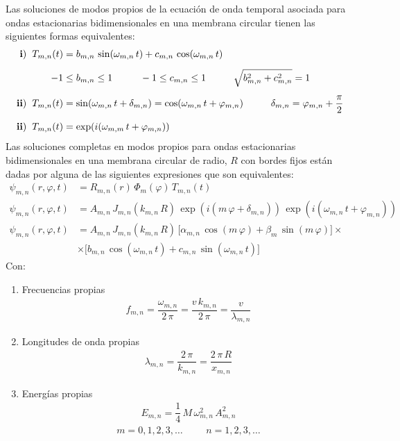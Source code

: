 Las soluciones de modos propios de la ecuación de onda temporal asociada para ondas estacionarias bidimensionales en una membrana circular tienen las siguientes formas equivalentes:
\begin{align*}
\mathbf{i)} \hspace{0.2cm} T_{m,n} (t) &= b_{m,n} \, \sin (\omega_{m,n} \, t) + c_{m,n} \, \cos (\omega_{m,n} \, t) \\[0.5em]
-1 &\leq b_{m,n} \leq 1 \hspace{1cm} -1 \leq c_{m,n} \leq 1 \hspace{1cm} \sqrt{b_{m,n}^{2} + c_{m,n}^{2}} = 1 \\[0.5em]
\mathbf{ii)} \hspace{0.2cm} T_{m,n} (t) &= \sin (\omega_{m,n} \, t + \delta_{m,n}) = \cos(\omega_{m,n} \, t + \varphi_{m,n}) \hspace{1cm} \delta_{m,n} = \varphi_{m,n} + \dfrac{\pi}{2} \\[0.5em]
\mathbf{ii)} \hspace{0.2cm} T_{m,n} (t) &= \exp(i(\omega_{m,m} \, t + \varphi_{m,n}))
\end{align*}
Las soluciones completas en modos propios para ondas estacionarias bidimensionales en una membrana circular de radio, $R$ con bordes fijos están dadas por alguna de las siguientes expresiones que son equivalentes:
\begin{align*}
\psi_{m,n} (r ,\varphi, t) &= R_{m,n} (r) \, \Phi_{m} (\varphi) \, T_{m,n} (t) \\[0.5em]
\psi_{m,n} (r ,\varphi, t) &= A_{m,n} \, J_{m,n} (k_{m,n} \, R) \, \exp(i(m \, \varphi + \delta_{m,n})) \, \exp(i(\omega_{m,n} \, t + \varphi_{m,n})) \\[0.5em]
\psi_{m,n} (r ,\varphi, t) &= A_{m,n} \, J_{m,n} (k_{m,n} \, R) \, \big[ \alpha_{m,n} \,  \cos (m \, \varphi) + \beta_{m} \, \sin (m \, \varphi) \big] \times \\[0.5em]
&\times \big[ b_{m,n} \,  \cos (\omega_{m,n} \, t) + c_{m,n} \, \sin (\omega_{m,n} \, t) \big]
\end{align*}
Con:
\begin{enumerate}[label=\alph*)]
\item Frecuencias propias
\begin{align*}
f_{m,n} = \dfrac{\omega_{m,n}}{2 \, \pi} = \dfrac{v \, k_{m,n}}{2 \, \pi} = \dfrac{v}{\lambda_{m,n}}
\end{align*}
\item Longitudes de onda propias
\begin{align*}
\lambda_{m,n} = \dfrac{2 \, \pi}{k_{m,n}} = \dfrac{2 \, \pi \, R}{x_{m,n}}
\end{align*}
\item Energías propias
\begin{align*}
E_{m,n} = \dfrac{1}{4} \, M \, \omega_{m,n}^{2} \, A_{m,n}^{2}
\end{align*}
\begin{align*}
m = 0, 1, 2, 3, \ldots \hspace{1cm} n = 1, 2, 3, \ldots
\end{align*}
\end{enumerate}
